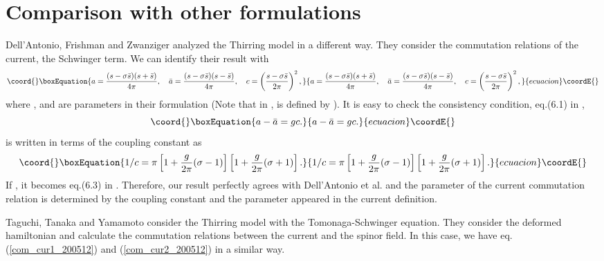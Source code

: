 \documentclass[a4paper,fleqn]{article}
\begin{document}
\section{Comparison with other formulations}
Dell'Antonio, Frishman and Zwanziger \cite{del_fri_zwa} 
analyzed the Thirring model in a different way. They consider
the commutation relations of the current, the Schwinger term.
 We can identify their result with
\begin{equation}\coord{}\boxEquation{
a = \frac{(s - \sigma \bar s)(s + \bar s)}{4 \pi}, \quad
\bar a =  \frac{(s - \sigma \bar s)(s - \bar s)}{4 \pi}, \quad
c = \left(\frac{s - \sigma \bar s}{2 \pi} \right)^2,
}{
a = \frac{(s - \sigma \bar s)(s + \bar s)}{4 \pi}, \quad
\bar a =  \frac{(s - \sigma \bar s)(s - \bar s)}{4 \pi}, \quad
c = \left(\frac{s - \sigma \bar s}{2 \pi} \right)^2,
}{ecuacion}\coordE{}\end{equation}
where \coordHE{}, \coordHE{} and \coordHE{} are parameters in their formulation 
(Note that in \cite{del_fri_zwa}, \myHighlight{$\epsilon_{\mu\nu}$}\coordHE{} is defined by \coordHE{}).
It is easy to check the consistency condition, eq.(6.1) in \cite{del_fri_zwa}, 
\begin{equation}\coord{}\boxEquation{
a - \bar{a} = g c .
}{
a - \bar{a} = g c .
}{ecuacion}\coordE{}\end{equation}
\coordHE{} is written in terms of the coupling constant \coordHE{} as
\begin{equation}\coord{}\boxEquation{
 1/c = \pi \left[ 1 + \frac{g}{2 \pi} (\sigma - 1) \right]
           \left[ 1 + \frac{g}{2 \pi} (\sigma + 1) \right].
\label{c_g}
}{
 1/c = \pi \left[ 1 + \frac{g}{2 \pi} (\sigma - 1) \right]
           \left[ 1 + \frac{g}{2 \pi} (\sigma + 1) \right].
}{ecuacion}\coordE{}\end{equation}
If \coordHE{}, it becomes eq.(6.3) in \cite{del_fri_zwa}. Therefore, our result 
perfectly agrees with Dell'Antonio et al. and the parameter of the current commutation relation is 
determined by the coupling constant and the parameter \myHighlight{$\sigma$}\coordHE{} 
appeared in  the current definition.

Taguchi, Tanaka and Yamamoto \cite{tag_tan_yam} consider the Thirring model 
with the Tomonaga-Schwinger equation. 
They consider the deformed hamiltonian and calculate the commutation relations 
between the current and the spinor field. 
In this case, we have eq.(\ref{com_cur1_200512}) and (\ref{com_cur2_200512}) 
in a similar way.
\end{document}
